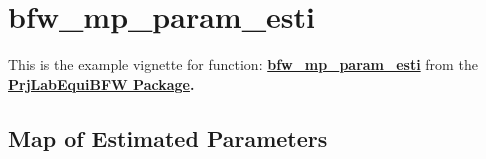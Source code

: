 \documentclass[
]{book}
\begin{document}
\hypertarget{bfw_mp_param_esti}{%
\section{bfw\_mp\_param\_esti}\label{bfw_mp_param_esti}}

This is the example vignette for function:
\href{https://github.com/FanWangEcon/PrjLabEquiBFW/tree/main/PrjLabEquiBFW/params/bfw_mp_param_esti.m}{\textbf{bfw\_mp\_param\_esti}}
from the \href{https://fanwangecon.github.io/PrjLabEquiBFW/}{\textbf{PrjLabEquiBFW
Package}}\textbf{.}

\hypertarget{map-of-estimated-parameters}{%
\subsection{Map of Estimated Parameters}\label{map-of-estimated-parameters}}
\end{document}
